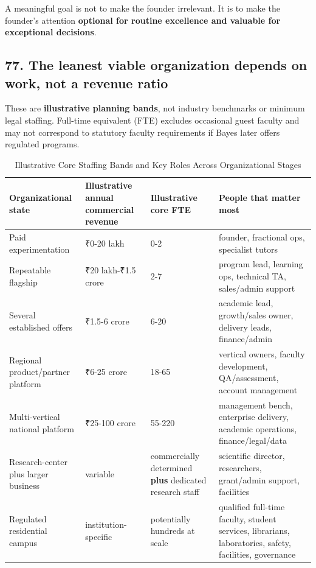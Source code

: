 A meaningful goal is not to make the founder irrelevant. It is to make the founder's attention \textbf{optional for routine excellence and valuable for exceptional decisions}.

\subsection{77. The leanest viable organization depends on work, not a revenue ratio}

These are \textbf{illustrative planning bands}, not industry benchmarks or minimum legal staffing. Full-time equivalent (FTE) excludes occasional guest faculty and may not correspond to statutory faculty requirements if Bayes later offers regulated programs.

\begin{table}[t]
\centering
\small
\caption{Illustrative Core Staffing Bands and Key Roles Across Organizational Stages}
\label{tab:ch36_headcount_bands}
\begin{tabularx}{\textwidth}{p{3.0cm} p{3.0cm} p{2.5cm} X}
\toprule
\textbf{ Organizational state } & \textbf{ Illustrative annual commercial revenue } & \textbf{ Illustrative core FTE } & \textbf{ People that matter most } \\
\midrule
 Paid experimentation  &  \textnormal{₹}0-20 lakh  &  0-2  &  founder, fractional ops, specialist tutors  \\
 Repeatable flagship  &  \textnormal{₹}20 lakh-\textnormal{₹}1.5 crore  &  2-7  &  program lead, learning ops, technical TA, sales/\allowbreak admin support  \\
 Several established offers  &  \textnormal{₹}1.5-6 crore  &  6-20  &  academic lead, growth/\allowbreak sales owner, delivery leads, finance/\allowbreak admin  \\
 Regional product/\allowbreak partner platform  &  \textnormal{₹}6-25 crore  &  18-65  &  vertical owners, faculty development, QA/\allowbreak assessment, account management  \\
 Multi-vertical national platform  &  \textnormal{₹}25-100 crore  &  55-220  &  management bench, enterprise delivery, academic operations, finance/\allowbreak legal/data  \\
 Research-center plus larger business  &  variable  &  commercially determined \textbf{plus} dedicated research staff  &  scientific director, researchers, grant/\allowbreak admin support, facilities  \\
 Regulated residential campus  &  institution-specific  &  potentially hundreds at scale  &  qualified full-time faculty, student services, librarians, laboratories, safety, facilities, governance  \\
\bottomrule
\end{tabularx}
\end{table}

